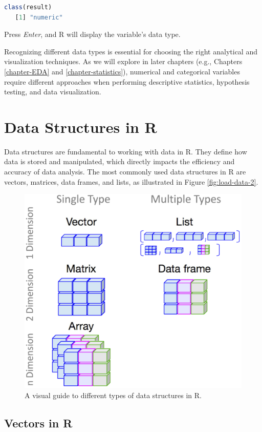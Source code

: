 \documentclass[
]{book}
\theoremstyle{definition}
\theoremstyle{definition}
\theoremstyle{definition}
\theoremstyle{definition}
\theoremstyle{remark}
\begin{document}
\begin{lstlisting}[language=R]
class(result)
   [1] "numeric"
\end{lstlisting}

Press \emph{Enter}, and R will display the variable's data type.

Recognizing different data types is essential for choosing the right analytical and visualization techniques. As we will explore in later chapters (e.g., Chapters \ref{chapter-EDA} and \ref{chapter-statistics}), numerical and categorical variables require different approaches when performing descriptive statistics, hypothesis testing, and data visualization.

\section{Data Structures in R}\label{data-structures-in-r}

Data structures are fundamental to working with data in R. They define how data is stored and manipulated, which directly impacts the efficiency and accuracy of data analysis. The most commonly used data structures in R are vectors, matrices, data frames, and lists, as illustrated in Figure \ref{fig:load-data-2}.

\begin{figure}

{\centering \includegraphics[width=0.6\linewidth]{images/ch1_R-objects} 

}

\caption{A visual guide to different types of data structures in R.}\label{fig:R-objects}
\end{figure}

\subsection*{Vectors in R}\label{vectors-in-r}
\end{document}
